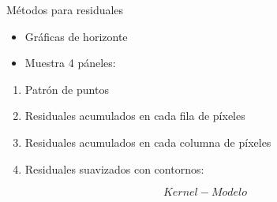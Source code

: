 \documentclass[
  11pt,
  ignorenonframetext,
]{beamer}
\providecommand{\tightlist}{%
  \setlength{\itemsep}{0pt}\setlength{\parskip}{0pt}}
\begin{document}
\begin{frame}{Métodos para residuales}
\protect\hypertarget{muxe9todos-para-residuales}{}
\begin{itemize}
\item
  Gráficas de horizonte
\item
  Muestra 4 páneles:
\end{itemize}

\begin{enumerate}
\tightlist
\item
  Patrón de puntos
\item
  Residuales acumulados en cada fila de píxeles
\item
  Residuales acumulados en cada columna de píxeles
\item
  Residuales suavizados con contornos:
\end{enumerate}

\[Kernel - Modelo\]
\end{frame}
\end{document}
